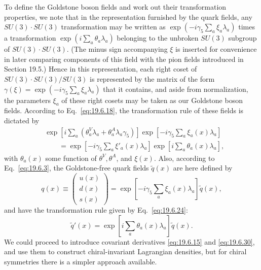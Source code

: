 To define the Goldstone boson fields and work out their transformation properties, we note that in the representation furnished by the quark fields, any $SU(3)\cdot SU(3)$ transformation may be written as $\exp(-i\gamma_5\sum_a\xi_a\lambda_a)$ times a transformation $\exp(i\sum_a\theta_a\lambda_a)$ belonging to the unbroken $SU(3)$ subgroup of $SU(3)\cdot SU(3)$. (The minus sign accompanying $\xi$ is inserted for convenience in later comparing components of this field with the pion fields introduced in Section 19.5.) Hence in this representation, each right coset of $SU(3)\cdot SU(3)/SU(3)$ is represented by the matrix of the form $\gamma(\xi)=\exp(-i\gamma_5\sum_a\xi_a\lambda_a)$ that it contains, and aside from normalization, the parameters $\xi_a$ of these right cosets may be taken as our Goldstone boson fields. According to Eq.~\eqref{eq:19.6.18}, the transformation rule of these fields is dictated by
\begin{equation}
\begin{split}
&\exp\left[i\sum_a\left(\theta_a^V\lambda_a+
\theta_a^A\lambda_a\gamma_5\right)\right]
\exp\left[-i\gamma_5\sum_a\xi_a(x)\lambda_a\right]
\\
&\qquad
=\exp\left[-i\gamma_5\sum_a\xi'_a(x)\lambda_a\right]
\exp\left[i\sum_a\theta_a(x)\lambda_a\right],
\end{split}
\tag{19.7.3}\label{eq:19.7.3}
\end{equation}
with $\theta_a(x)$ some function of $\theta^V,\theta^A$, and $\xi(x)$. Also, according to Eq.~\eqref{eq:19.6.3}, the Goldstone-free quark fields $\widetilde q(x)$ are here defined by
\begin{equation}
q(x)\equiv
\begin{pmatrix}u(x)\\d(x)\\s(x)\end{pmatrix}
=\exp\left[-i\gamma_5\sum_a\xi_a(x)\lambda_a\right]\widetilde q(x),
\tag{19.7.4}\label{eq:19.7.4}
\end{equation}
and have the transformation rule given by Eq.~\eqref{eq:19.6.24}:
\begin{equation}
\widetilde q'(x)
=\exp\left[i\sum_a\theta_a(x)\lambda_a\right]\widetilde q(x).
\tag{19.7.5}\label{eq:19.7.5}
\end{equation}
We could proceed to introduce covariant derivatives \eqref{eq:19.6.15} and \eqref{eq:19.6.30}, and use them to construct chiral-invariant Lagrangian densities, but for chiral symmetries there is a simpler approach available.

